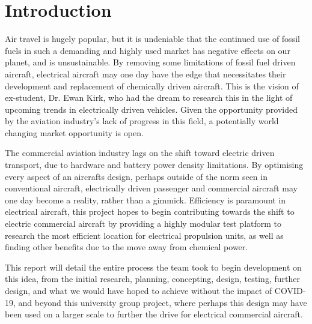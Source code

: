 \documentclass[../../main.tex]{subfiles}
\begin{document}
\chapter{Introduction} \label{chapter:introduction}

Air travel is hugely popular, but it is undeniable that the continued use of fossil fuels in such a demanding and highly used market has negative effects on our planet, and is unsustainable.
By removing some limitations of fossil fuel driven aircraft, electrical aircraft may one day have the edge that necessitates their development and replacement of chemically driven aircraft.
This is the vision of ex-student, Dr. Ewan Kirk, who had the dream to research this in the light of upcoming trends in electrically driven vehicles.
Given the opportunity provided by the aviation industry’s lack of progress in this field, a potentially world changing market opportunity is open. 

The commercial aviation industry lags on the shift toward electric driven transport, due to hardware and battery power density limitations.
By optimising every aspect of an aircrafts design, perhaps outside of the norm seen in conventional aircraft, electrically driven passenger and commercial aircraft may one day become a reality, rather than a gimmick.
Efficiency is paramount in electrical aircraft, this project hopes to begin contributing towards the shift to electric commercial aircraft by providing a highly modular test platform to research the most efficient location for electrical propulsion units, as well as finding other benefits due to the move away from chemical power. 

This report will detail the entire process the team took to begin development on this idea, from the initial research, planning, concepting, design, testing, further design, and what we would have hoped to achieve without the impact of COVID-19, and beyond this university group project, where perhaps this design may have been used on a larger scale to further the drive for electrical commercial aircraft. 
\end{document}
